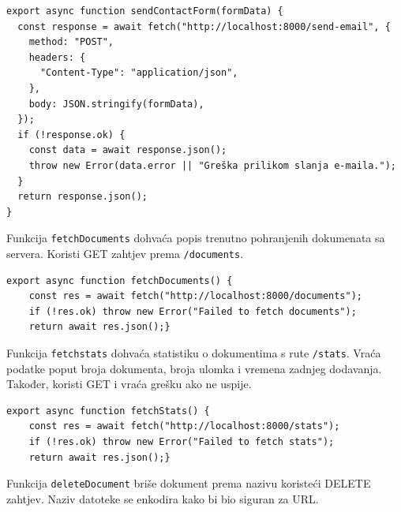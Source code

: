 \documentclass[]{foi}
\begin{document}
\begin{longlisting}
\begin{verbatim}
export async function sendContactForm(formData) {
  const response = await fetch("http://localhost:8000/send-email", {
    method: "POST",
    headers: {
      "Content-Type": "application/json",
    },
    body: JSON.stringify(formData),
  });
  if (!response.ok) {
    const data = await response.json();
    throw new Error(data.error || "Greška prilikom slanja e-maila.");
  }
  return response.json();
}
\end{verbatim}
\caption{Contact.jsx}
\label{lst:contact}
\end{longlisting}

Funkcija \verb|fetchDocuments| dohvaća popis trenutno pohranjenih dokumenata sa servera. Koristi GET zahtjev prema \verb|/documents|.

\begin{longlisting}
\begin{verbatim}
export async function fetchDocuments() {
    const res = await fetch("http://localhost:8000/documents");
    if (!res.ok) throw new Error("Failed to fetch documents");
    return await res.json();}
\end{verbatim}
\caption{Document.jsx 1/5}
\label{lst:document1}
\end{longlisting}

Funkcija \verb|fetchstats| dohvaća statistiku o dokumentima s rute \verb|/stats|. Vraća podatke poput broja dokumenta, broja ulomka i vremena zadnjeg dodavanja. 
Također, koristi GET i vraća grešku ako ne uspije.

\begin{longlisting}
\begin{verbatim}
export async function fetchStats() {
    const res = await fetch("http://localhost:8000/stats");
    if (!res.ok) throw new Error("Failed to fetch stats");
    return await res.json();}
\end{verbatim}
\caption{Document.jsx 2/5}
\label{lst:document2}
\end{longlisting}

Funkcija \verb|deleteDocument| briše dokument prema nazivu koristeći DELETE zahtjev. Naziv datoteke se enkodira kako bi bio siguran za URL.
\end{document}
